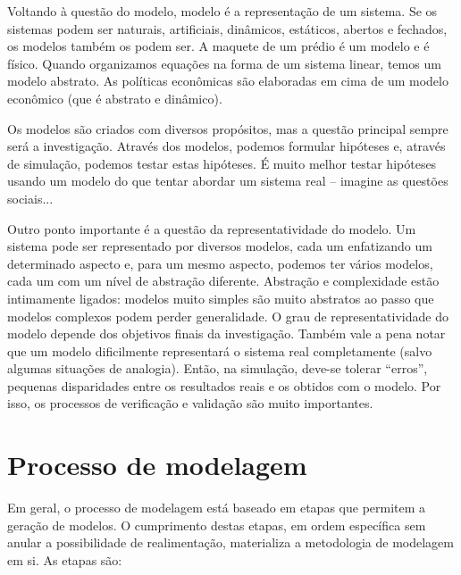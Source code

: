 \documentclass[a4paper,12pt,oneside,onecolumn]{uerj/uerj}
\begin{document}
Voltando à questão do modelo, modelo é a representação de um sistema. Se os sistemas podem ser naturais, artificiais, dinâmicos, estáticos, abertos e fechados, os modelos também os podem ser. A maquete de um prédio é um modelo e é físico. Quando organizamos equações na forma de um sistema linear, temos um modelo abstrato. As políticas econômicas são elaboradas em cima de um modelo econômico (que é abstrato e dinâmico).

Os modelos são criados com diversos propósitos, mas a questão principal sempre será a investigação. Através dos modelos, podemos formular hipóteses e, através de simulação, podemos testar estas hipóteses. É muito melhor testar hipóteses usando um modelo do que tentar abordar um sistema real -- imagine as questões sociais...

Outro ponto importante é a questão da representatividade do modelo. Um sistema pode ser representado por diversos modelos, cada um enfatizando um determinado aspecto e, para um mesmo aspecto, podemos ter vários modelos, cada um com um nível de abstração diferente. Abstração e complexidade estão intimamente ligados: modelos muito simples são muito abstratos ao passo que modelos complexos podem perder generalidade. O grau de representatividade do modelo depende dos objetivos finais da investigação. Também vale a pena notar que um modelo dificilmente representará o sistema real completamente (salvo algumas situações de analogia). Então, na simulação, deve-se tolerar ``erros'', pequenas disparidades entre os resultados reais e os obtidos com o modelo. Por isso, os processos de verificação e validação são muito importantes.

\section{Processo de modelagem}

Em geral, o processo de modelagem está baseado em etapas que permitem a geração de modelos. O cumprimento destas etapas, em ordem específica sem anular a possibilidade de realimentação, materializa a metodologia de modelagem em si. As etapas são:
\end{document}
